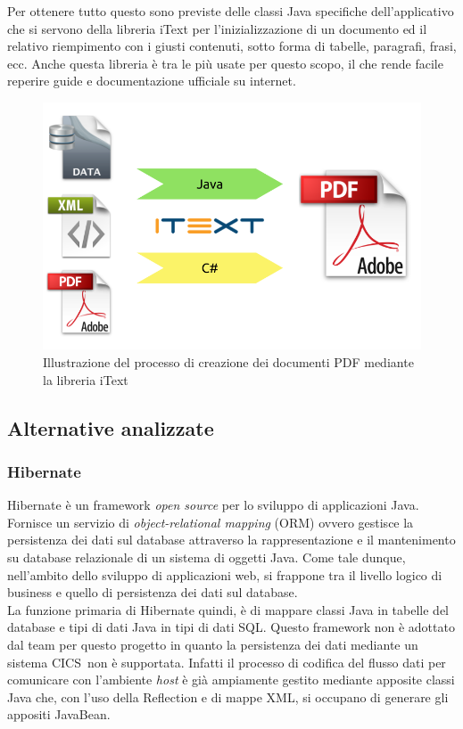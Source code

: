 	Per ottenere tutto questo sono previste delle classi Java specifiche dell'applicativo che si servono della libreria iText per l'inizializzazione di un documento ed il relativo riempimento con i giusti contenuti, sotto forma di tabelle, paragrafi, frasi, ecc. Anche questa libreria è tra le più usate per questo scopo, il che rende facile reperire guide e documentazione ufficiale su internet.
	
	\begin{figure}[H]
		\centering
	   	\includegraphics[width=1\textwidth]{immagini/itext}
	   	\caption{Illustrazione del processo di creazione dei documenti PDF mediante la libreria iText}
	\end{figure}
	
	\subsection{Alternative analizzate}
	
	\subsubsection{Hibernate}	
	Hibernate è un framework \textit{open source} per lo sviluppo di applicazioni Java. Fornisce un servizio di \textit{object-relational mapping} (ORM) ovvero gestisce la persistenza dei dati sul database attraverso la rappresentazione e il mantenimento su database relazionale di un sistema di oggetti Java. Come tale dunque, nell'ambito dello sviluppo di applicazioni web, si frappone tra il livello logico di business e quello di persistenza dei dati sul database.\\
	
	La funzione primaria di Hibernate quindi, è di mappare classi Java in tabelle del database e tipi di dati Java in tipi di dati SQL. Questo framework non è adottato dal team per questo progetto in quanto la persistenza dei dati mediante un sistema CICS\glossario\ non è supportata. Infatti il processo di codifica del	flusso dati per comunicare con l'ambiente \textit{host} è già ampiamente gestito mediante apposite classi Java che, con l'uso della Reflection e di mappe XML, si occupano di generare gli appositi JavaBean\glossario .
	

